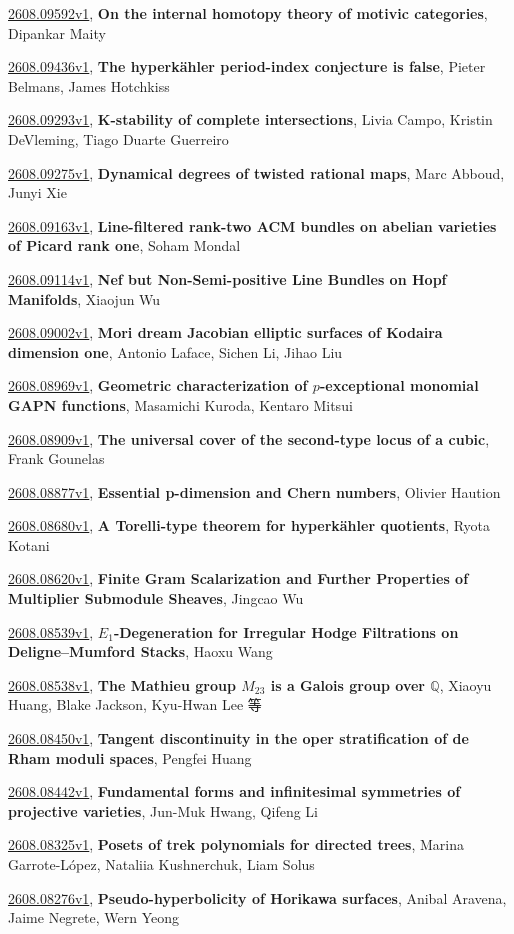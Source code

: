 \documentclass[9pt, a4paper]{article}
\theoremstyle{plain}
\theoremstyle{definition}
\theoremstyle{remark}
\newcommand{\arxiv}[3]{\href{https://arxiv.org/abs/#1}{#1}, \textbf{\textcolor{arxivblue}{#2}}, #3}
\begin{document}
\arxiv{2608.09592v1}{On the internal homotopy theory of motivic categories}{Dipankar Maity}

\arxiv{2608.09436v1}{The hyperkähler period-index conjecture is false}{Pieter Belmans, James Hotchkiss}

\arxiv{2608.09293v1}{K-stability of complete intersections}{Livia Campo, Kristin DeVleming, Tiago Duarte Guerreiro}

\arxiv{2608.09275v1}{Dynamical degrees of twisted rational maps}{Marc Abboud, Junyi Xie}

\arxiv{2608.09163v1}{Line-filtered rank-two ACM bundles on abelian varieties of Picard rank one}{Soham Mondal}

\arxiv{2608.09114v1}{Nef but Non-Semi-positive Line Bundles on Hopf Manifolds}{Xiaojun Wu}

\arxiv{2608.09002v1}{Mori dream Jacobian elliptic surfaces of Kodaira dimension one}{Antonio Laface, Sichen Li, Jihao Liu}

\arxiv{2608.08969v1}{Geometric characterization of $p$-exceptional monomial GAPN functions}{Masamichi Kuroda, Kentaro Mitsui}

\arxiv{2608.08909v1}{The universal cover of the second-type locus of a cubic}{Frank Gounelas}

\arxiv{2608.08877v1}{Essential p-dimension and Chern numbers}{Olivier Haution}

\arxiv{2608.08680v1}{A Torelli-type theorem for hyperkähler quotients}{Ryota Kotani}

\arxiv{2608.08620v1}{Finite Gram Scalarization and Further Properties of Multiplier Submodule Sheaves}{Jingcao Wu}

\arxiv{2608.08539v1}{$E_1$-Degeneration for Irregular Hodge Filtrations on Deligne--Mumford Stacks}{Haoxu Wang}

\arxiv{2608.08538v1}{The Mathieu group $M_{23}$ is a Galois group over $\mathbb{Q}$}{Xiaoyu Huang, Blake Jackson, Kyu-Hwan Lee 等}

\arxiv{2608.08450v1}{Tangent discontinuity in the oper stratification of de Rham moduli spaces}{Pengfei Huang}

\arxiv{2608.08442v1}{Fundamental forms and infinitesimal symmetries of projective varieties}{Jun-Muk Hwang, Qifeng Li}

\arxiv{2608.08325v1}{Posets of trek polynomials for directed trees}{Marina Garrote-López, Nataliia Kushnerchuk, Liam Solus}

\arxiv{2608.08276v1}{Pseudo-hyperbolicity of Horikawa surfaces}{Anibal Aravena, Jaime Negrete, Wern Yeong}
\end{document}
